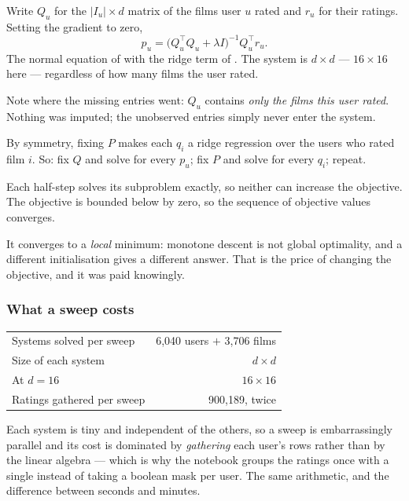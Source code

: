 \documentclass[11pt,a4paper]{article}
\begin{document}
\begin{derivbox}[title={The ALS half-step}]
Write $Q_u$ for the $|I_u| \times d$ matrix of the films user $u$ rated and
$r_u$ for their ratings. Setting the gradient to zero,
\[
  p_u = \big(Q_u^{\top}Q_u + \lambda I\big)^{-1} Q_u^{\top} r_u .
\]
The normal equation of  with the ridge term of . The
system is $d\times d$ --- $16\times16$ here --- regardless of how many films
the user rated.

Note where the missing entries went: $Q_u$ contains \emph{only the films this
user rated}. Nothing was imputed; the unobserved entries simply never enter the
system.
\end{derivbox}

By symmetry, fixing $P$ makes each $q_i$ a ridge regression over the users who
rated film $i$. So: fix $Q$ and solve for every $p_u$; fix $P$ and solve for
every $q_i$; repeat.

\begin{proposition}
Each half-step solves its subproblem exactly, so neither can increase the
objective. The objective is bounded below by zero, so the sequence of objective
values converges.
\end{proposition}

It converges to a \emph{local} minimum: monotone descent is not global
optimality, and a different initialisation gives a different answer. That is
the price of changing the objective, and it was paid knowingly.

\subsubsection{What a sweep costs}

\begin{center}
\small
\begin{tabular}{lr}
\toprule
Systems solved per sweep & 6{,}040 users $+$ 3{,}706 films \\
Size of each system      & $d \times d$ \\
At $d = 16$              & $16\times16$ \\
Ratings gathered per sweep & 900{,}189, twice \\
\bottomrule
\end{tabular}
\end{center}

Each system is tiny and independent of the others, so a sweep is embarrassingly
parallel and its cost is dominated by \emph{gathering} each user's rows rather
than by the linear algebra --- which is why the notebook groups the ratings
once with a single  instead of taking a boolean mask per user.
The same arithmetic, and the difference between seconds and minutes.
\end{document}
